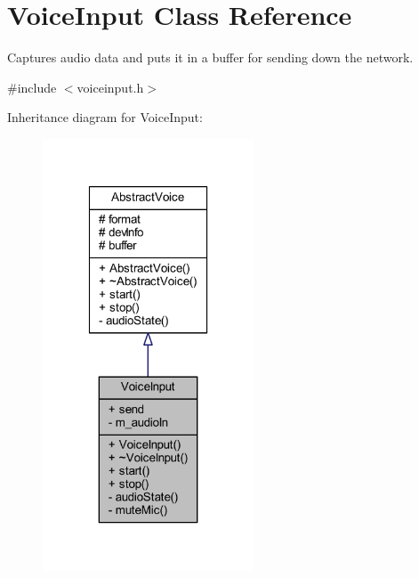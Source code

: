 \hypertarget{class_voice_input}{
\section{\-Voice\-Input \-Class \-Reference}
\label{class_voice_input}
}


\-Captures audio data and puts it in a buffer for sending down the network.  




{\ttfamily \#include $<$voiceinput.\-h$>$}



\-Inheritance diagram for \-Voice\-Input\-:\nopagebreak
\begin{figure}[H]
\begin{center}
\leavevmode
\includegraphics[width=178pt]{class_voice_input__inherit__graph}
\end{center}
\end{figure}


